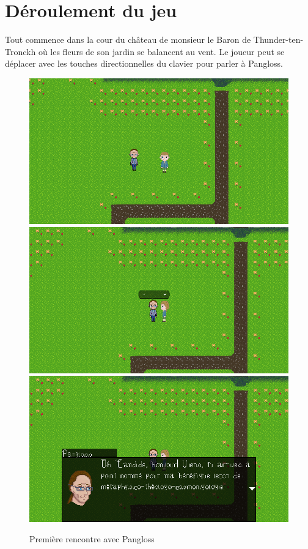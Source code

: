 \documentclass[11pt]{article}
\begin{document}
\section{Déroulement du jeu}
Tout commence dans la cour du château de monsieur le Baron de Thunder-ten-Tronckh où les fleurs de son jardin se balancent au vent. Le joueur peut se déplacer avec les touches directionnelles du clavier pour parler à Pangloss.
\begin{figure}[H]
\includegraphics[scale=0.32]{gameplay1}
\includegraphics[scale=0.32]{gameplay2}
\includegraphics[scale=0.32]{gameplay3}
\centering
\caption{Première rencontre avec Pangloss}
\end{figure}
\end{document}
